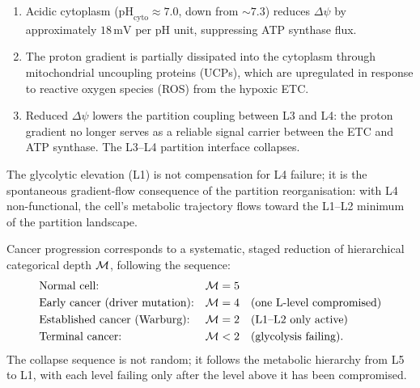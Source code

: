 \begin{enumerate}[label=(\roman*)]
  \item Acidic cytoplasm ($\mathrm{pH}_{\mathrm{cyto}} \approx 7.0$, down from
        $\sim 7.3$) reduces $\Delta\psi$ by approximately $18\,\mathrm{mV}$ per
        pH unit, suppressing ATP synthase flux.
  \item The proton gradient is partially dissipated into the cytoplasm through
        mitochondrial uncoupling proteins (UCPs), which are upregulated in
        response to reactive oxygen species (ROS) from the hypoxic ETC.
  \item Reduced $\Delta\psi$ lowers the partition coupling between L3 and L4:
        the proton gradient no longer serves as a reliable signal carrier
        between the ETC and ATP synthase. The L3--L4 partition interface collapses.
\end{enumerate}

The glycolytic elevation (L1) is not compensation for L4 failure; it is the
spontaneous gradient-flow consequence of the partition reorganisation: with L4
non-functional, the cell's metabolic trajectory flows toward the L1--L2 minimum
of the partition landscape.

\begin{theorem}
\label{thm:cancer_depth_collapse}
Cancer progression corresponds to a systematic, staged reduction of hierarchical
categorical depth $\mathcal{M}$, following the sequence:
\begin{equation}
  \begin{array}{ll}
    \text{Normal cell:} & \mathcal{M} = 5 \\[3pt]
    \text{Early cancer (driver mutation):} & \mathcal{M} = 4 \quad (\text{one L-level compromised}) \\[3pt]
    \text{Established cancer (Warburg):} & \mathcal{M} = 2 \quad (\text{L1--L2 only active}) \\[3pt]
    \text{Terminal cancer:} & \mathcal{M} < 2 \quad (\text{glycolysis failing}).
  \end{array}
  \label{eq:cancer_depth_stages}
\end{equation}
The collapse sequence is not random; it follows the metabolic hierarchy from
L5 to L1, with each level failing only after the level above it has been
compromised.
\end{theorem}

